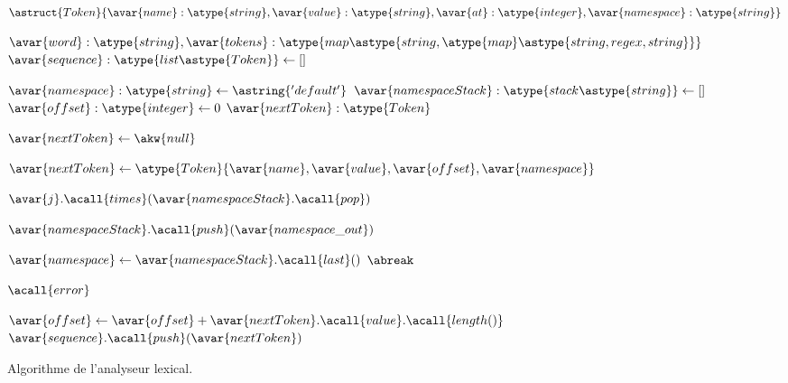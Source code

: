 \begin{figure}

\begin{algorithmic}[1]

\State $\astruct{Token}\{
    \avar{name}: \atype{string},
    \avar{value}: \atype{string},
    \avar{at}: \atype{integer},
    \avar{namespace}: \atype{string}
\}$


  \Require $\avar{word}: \atype{string}, \avar{tokens}:
  \atype{map\astype{string, \atype{map}\astype{string, regex, string}}}$
  \Ensure $\avar{sequence}: \atype{list\astype{Token}} \gets []$

  \State $\avar{namespace}: \atype{string} \gets \astring{'default'}$
  \State $\avar{namespaceStack}: \atype{stack\astype{string}} \gets []$
  \State $\avar{offset}: \atype{integer} \gets 0$
  \State $\avar{nextToken}: \atype{Token}$


      \State $\avar{nextToken} \gets \akw{null}$



              \State $\avar{nextToken} \gets \atype{Token}\{\avar{name}, \avar{value}, \avar{offset}, \avar{namespace}\}$


                  \State $\avar{j}.\acall{times}(\avar{namespaceStack}.\acall{pop})$

              \Else

                  \State $\avar{namespaceStack}.\acall{push}(\avar{namespace\_out})$

              \EndIf

              \State $\avar{namespace} \gets \avar{namespaceStack}.\acall{last}()$
              \State $\abreak$

          \EndIf

      \EndFor


        \State $\acall{error}$

      \EndIf

      \State $\avar{offset} \gets \avar{offset} + \avar{nextToken}.\acall{value}.\acall{length()}$
      \State $\avar{sequence}.\acall{push}(\avar{nextToken})$

  \EndWhile

\EndFunction

\end{algorithmic}

\caption{\label{figure:data:algo_lexer} Algorithme de l'analyseur lexical.}

\end{figure}

